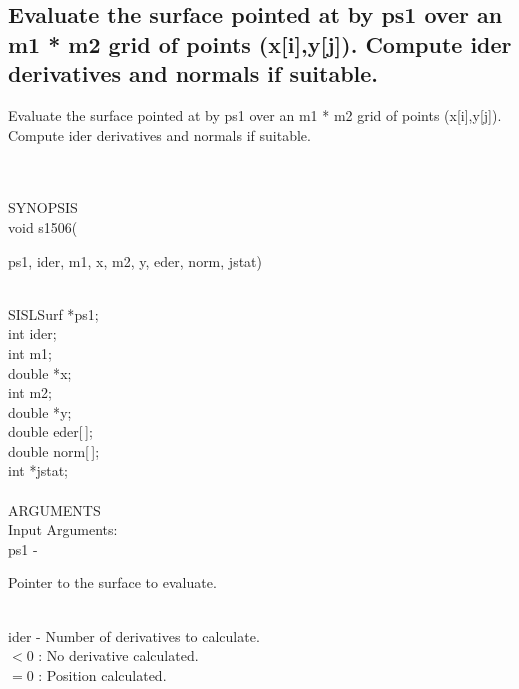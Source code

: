 \subsection{Evaluate the surface pointed at by ps1 over an m1 * m2 grid
               of points (x[i],y[j]). Compute ider derivatives and normals
               if suitable.}
\begin{minipg1}
Evaluate the surface pointed at by ps1 over an m1 * m2 grid
               of points (x[i],y[j]). Compute ider derivatives and normals
               if suitable.
\end{minipg1} \\ \\
SYNOPSIS\\
        \> void s1506(\begin{minipg3}
            {\fov ps1}, {\fov ider}, {\fov m1}, {\fov x}, {\fov m2}, {\fov y}, {\fov eder}, {\fov norm}, {\fov jstat})
                \end{minipg3}\\
                \>\>    SISLSurf \>*{\fov ps1};\\
                \>\>    int    \>  {\fov ider};\\
                \>\>    int    \>  {\fov m1};\\
                \>\>    double    \>  *{\fov x};\\
                \>\>    int    \>  {\fov m2};\\
                \>\>    double    \>  *{\fov y};\\
                \>\>    double    \>  {\fov eder}[\,];\\
                \>\>    double    \>  {\fov norm}[\,];\\
                \>\>    int    \>  *{\fov jstat};\\
\\
ARGUMENTS\\
	\>Input Arguments:\\
        \>\>    {\fov ps1}\> - \>  \begin{minipg2}
                     Pointer to the surface to evaluate.
                               \end{minipg2}\\
        \>\>    {\fov ider}\> - \> Number of derivatives to calculate.\\
                 \>\>\>\>\>      $< 0$ : No derivative calculated.\\
		 \>\>\>\>\>      $= 0$ : Position calculated.\\

